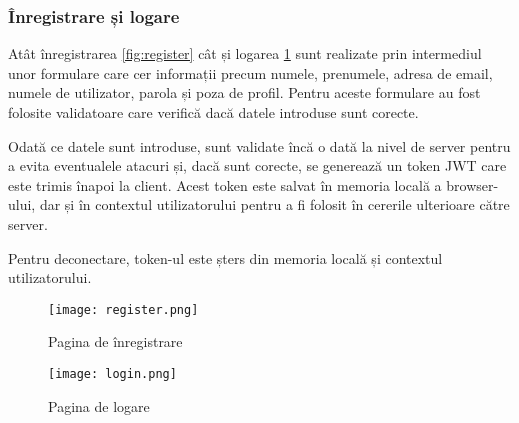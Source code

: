 

\subsubsection{Înregistrare și logare}
Atât înregistrarea \ref{fig:register} cât și logarea \ref{fig:login} sunt realizate prin
intermediul unor formulare care cer informații precum numele, prenumele, adresa de email,
numele de utilizator, parola și poza de profil. Pentru aceste formulare au fost folosite
validatoare care verifică dacă datele introduse sunt corecte.
\par
Odată ce datele sunt introduse, sunt validate încă o dată la nivel de server pentru a evita 
eventualele atacuri și, dacă sunt corecte, se generează un token JWT care este trimis înapoi
la client. Acest token este salvat în memoria locală a browser-ului, dar și în contextul
utilizatorului pentru a fi folosit în cererile ulterioare către server.
\par
Pentru deconectare, token-ul este șters din memoria locală și contextul utilizatorului.

\begin{figure}[h] 
    \centering
    \begin{minipage}{0.49\textwidth}
        \centering
        \texttt{[image: register.png]}
        \caption{Pagina de înregistrare}
        \label{fig:register}
    \end{minipage}\hfill
    \begin{minipage}{0.49\textwidth}
        \centering
        \texttt{[image: login.png]}
        \caption{Pagina de logare}
        \label{fig:login}
    \end{minipage}
\end{figure}

